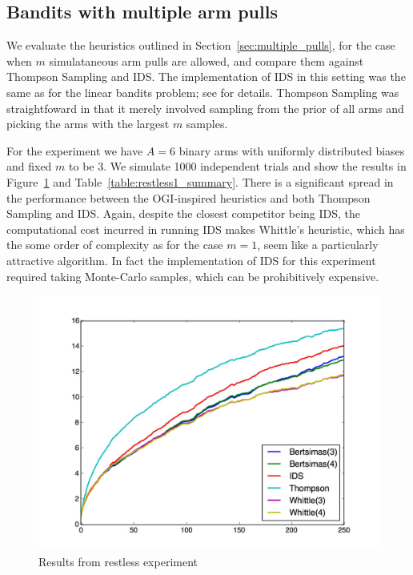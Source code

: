 \subsection{Bandits with multiple arm pulls}
We evaluate the heuristics outlined in Section~\ref{sec:multiple_pulls}, for the case when $m$ simulataneous arm pulls are allowed, and compare them against Thompson Sampling and IDS. The implementation of IDS in this setting was the same as for the linear bandits problem; see \citep{russo2014learning} for details. Thompson Sampling was straightfoward in that it merely involved sampling from the prior of all arms and picking the arms with the largest $m$ samples. 

For the experiment we have $A = 6$ binary arms with uniformly  distributed biases and fixed $m$ to be 3. We simulate 1000 independent trials and show the results in Figure~\ref{fig:restless1} and Table~\ref{table:restless1_summary}. There is a significant spread in the performance between the OGI-inspired heuristics and both Thompson Sampling and IDS. Again, despite the closest competitor being IDS, the computational cost incurred in running IDS makes Whittle's heuristic, which has the some order of complexity as for the case $m=1$, seem like a particularly attractive algorithm. In fact the implementation of IDS for this experiment required taking Monte-Carlo samples, which can be prohibitively expensive.
\begin{figure}
	\centering
	\includegraphics[width=0.5\linewidth]{plots/restless1}
	\caption{Results from restless experiment}
	\label{fig:restless1}
\end{figure}

